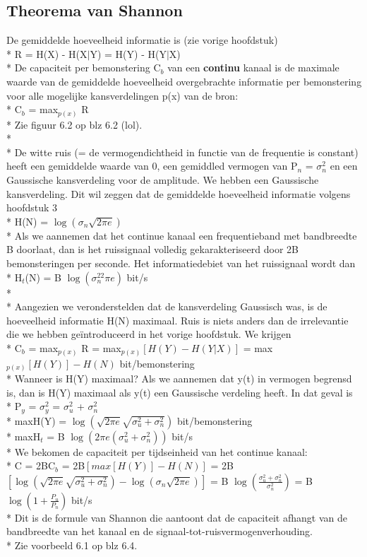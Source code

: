 \documentclass[10pt]{article}
\begin{document}
\subsection{Theorema van Shannon}
De gemiddelde hoeveelheid informatie is (zie vorige hoofdstuk)\\*
R = H(X) - H(X$|$Y) = H(Y) - H(Y$|$X)\\*
De capaciteit per bemonstering C$_b$ van een {\bf continu} kanaal is de maximale waarde van de gemiddelde hoeveelheid overgebrachte informatie per bemonstering voor alle mogelijke kansverdelingen p(x) van de bron:\\*
C$_b$ = max$_{p(x)}$ R\\*
{\scriptsize Zie figuur 6.2 op blz 6.2 (lol).}\\*\\*
De witte ruis (= de vermogendichtheid in functie van de frequentie is constant) heeft een gemiddelde waarde van 0, een gemiddled vermogen van P$_n$ = $\sigma_n^2$ en een Gaussische kansverdeling voor de amplitude. We hebben een Gaussische kansverdeling. Dit wil zeggen dat de gemiddelde hoeveelheid informatie volgens hoofdstuk 3\\*
H(N) = $\log{(\sigma_n\sqrt{2\pi e})}$\\*
Als we aannemen dat het continue kanaal een frequentieband met bandbreedte B doorlaat, dan is het ruissignaal volledig gekarakteriseerd door 2B bemonsteringen per seconde. Het informatiedebiet van het ruissignaal wordt dan\\*
H$_t$(N) = B $\log{(\sigma_n^22\pi e)}$ bit/s\\*\\*
Aangezien we veronderstelden dat de kansverdeling Gaussisch was, is de hoeveelheid informatie H(N) maximaal. Ruis is niets anders dan de irrelevantie die we hebben ge\"introduceerd in het vorige hoofdstuk. We krijgen\\*
C$_b$ = max$_{p(x)}$ R = max$_{p(x)}\left[H(Y) - H(Y|X)\right]$ = max$_{p(x)}\left[H(Y)\right] - H(N)$ bit/bemonstering\\*
Wanneer is H(Y) maximaal? Als we aannemen dat y(t) in vermogen begrensd is, dan is H(Y) maximaal als y(t) een Gaussische verdeling heeft. In dat geval is\\*
P$_y$ = $\sigma_y^2$ = $\sigma_u^2$ + $\sigma_n^2$\\*
maxH(Y) = $\log{(\sqrt{2\pi e}\sqrt{\sigma_u^2+\sigma_n^2})}$ bit/bemonstering\\*
maxH$_t$ = B $\log{\left(2\pi e(\sigma_u^2 + \sigma_n^2)\right)}$ bit/s\\*
We bekomen de capaciteit per tijdseinheid van het continue kanaal:\\*
C = 2BC$_b$ = 2B$\left[max\left[H(Y)\right]-H(N)\right]$ = 2B$\left[\log{(\sqrt{2\pi e}\sqrt{\sigma_u^2+\sigma_n^2})} - \log{(\sigma_n\sqrt{2\pi e})}\right]$ = B $\log{\left(\frac{\sigma_u^2 + \sigma_n^2}{\sigma_n^2}\right)}$ = B $\log{\left(1 + \frac{P_u}{P_n}\right)}$ bit/s\\*
Dit is de formule van Shannon die aantoont dat de capaciteit afhangt van de bandbreedte van het kanaal en de signaal-tot-ruisvermogenverhouding.\\*
{\scriptsize Zie voorbeeld 6.1 op blz 6.4.}
\end{document}
